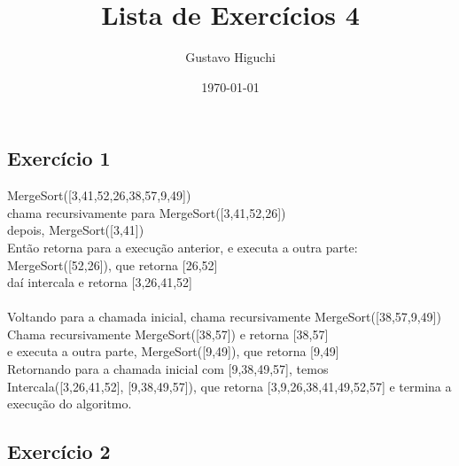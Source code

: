 \documentclass{article}
\title{Lista de Exercícios 4}
\author{Gustavo Higuchi}
\date{\today}
\begin{document}
\maketitle

\tableofcontents
\newpage


\chapter{}
\section{Exercício 1}
MergeSort([3,41,52,26,38,57,9,49])\\
chama recursivamente para MergeSort([3,41,52,26])\\
depois, MergeSort([3,41])\\
Então retorna para a execução anterior, e executa a outra parte:\\
MergeSort([52,26]), que retorna [26,52]\\
daí intercala e retorna [3,26,41,52]\\
\\
Voltando para a chamada inicial, chama recursivamente MergeSort([38,57,9,49])\\
Chama recursivamente MergeSort([38,57]) e retorna [38,57]\\
e executa a outra parte, MergeSort([9,49]), que retorna [9,49]\\
Retornando para a chamada inicial com [9,38,49,57], temos\\
Intercala([3,26,41,52], [9,38,49,57]), que retorna [3,9,26,38,41,49,52,57]
e termina a execução do algoritmo.

\section{Exercício 2}
\end{document}
